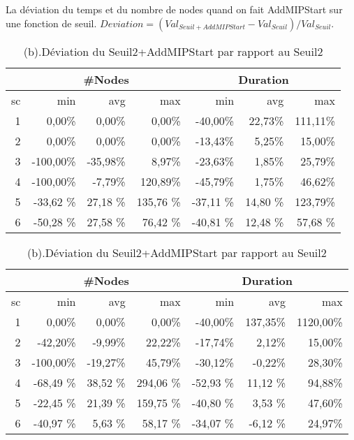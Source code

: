 \documentclass[twoside,fleqn]{EPURapport}
\begin{document}
La déviation du temps et du nombre de nodes quand on fait AddMIPStart sur une fonction de seuil. $Deviation = (Val_{Seuil+AddMIPStart}-Val_{Seuil})/Val_{Seuil}$.
\clearpage
\begin{table}[h]
    \centering
    \begin{tabular}{|r|r|r|r|r|r|r|}
    	\hline
&\multicolumn{3}{c|}{\#Nodes} &\multicolumn{3}{c|}{Duration}	\\ \hline
sc&min	    &avg	    & max	  &min	    &avg	   & max \\ \hline
1&	0,00\%&0,00\%&0,00\%&	-40,00\%&	22,73\%&111,11\%    \\ \hline
2&	0,00\%&0,00\%&0,00\%&	-13,43\%&	5,25\%&	15,00\%     \\ \hline
3&	-100,00\%&-35,98\%&8,97\%&	-23,63\%&	1,85\%&	25,79\%  \\ \hline
4 &-100,00\% &-7,79\% &120,89\% &-45,79\% &1,75\% &46,62\%  \\ \hline
5&-33,62	\%&27,18	\%&135,76 \%&	-37,11	\%&14,80	\%&123,79\%     \\ \hline
6&-50,28	\%&27,58	\%&76,42	\%&-40,81	\%&12,48	\%&57,68 \%     \\ \hline
    \end{tabular}
    \caption{(a).Déviation du Seuil1+AddMIPStart par rapport au Seuil1 } 
    \label{tab_cut2_ams1_tab1}
    
    \begin{tabular}{|r|r|r|r|r|r|r|}
    	\hline
&\multicolumn{3}{c|}{\#Nodes} &\multicolumn{3}{c|}{Duration}	\\ \hline
sc&min	    &avg	    & max	  &min	    &avg	   & max \\ \hline
1&	   0,00\%&	  0,00\%&	 0,00\%&	-40,00\%&	137,35\%&	1120,00\%    \\ \hline
2&	 -42,20\%&	 -9,99\%&	22,22\%&	-17,74\%&	  2,12\%&	  15,00\%     \\ \hline
3&	-100,00\%&	-19,27\%&	45,79\%&	-30,12\%&	 -0,22\%&	  28,30\%  \\ \hline
4&-68,49	\%&38,52	\%&294,06	\%&-52,93	\%&11,12	\%&94,88\%     \\ \hline
5&-22,45	\%&21,39	\%&159,75	\%&-40,80	\%&3,53	    \%&47,60\%     \\ \hline
6&-40,97	\%&5,63	    \%&58,17	\%&-34,07	\%&-6,12	\%&24,97\%     \\ \hline
    \end{tabular}
    \caption{(b).Déviation du Seuil2+AddMIPStart par rapport au Seuil2 }
    \label{tab_cut2_ams2_tab1}
\end{table}
\end{document}
